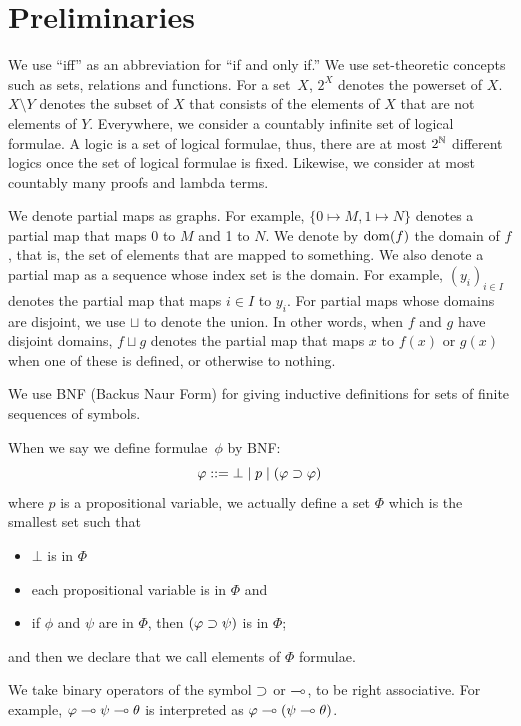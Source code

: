  \section{Preliminaries}
 \label{sec:prelim}

  We use ``iff'' as an abbreviation for ``if and only if.''
  We use set-theoretic concepts such as sets, relations and functions.
  For a set~$X$, $2^X$ denotes the powerset of $X$.
   $X\setminus Y$ denotes the subset of $X$ that consists of the
   elements of $X$ that are not elements of $Y$.
   Everywhere, we consider a countably infinite set of logical formulae.
   A logic is a set of logical formulae, thus, there are at most
   ${2^{\mathbb N}}$ different logics once the set of logical
   formulae is fixed.
   Likewise, we consider at most countably many proofs and lambda terms.

   We denote partial maps as graphs.
   For example, $\{0\mapsto M, 1\mapsto N\}$ denotes a partial map that
   maps 0 to $M$ and 1 to $N$.
   We denote by $\mathop{\mathrm{dom}}(f)$ the domain of $f$, that is,
   the set of elements that are mapped to something.
   We also denote a partial map as a sequence whose index set is the domain.
   For example, $(y_i)_{i\in I}$ denotes the partial map that maps
   $i\in I$ to $y_i$.
   For partial maps whose domains are disjoint, we use $\sqcup$ to
   denote the union.
   In other words, when $f$ and $g$ have disjoint domains, $f\sqcup g$
   denotes the
   partial map that maps $x$ to $f(x)$ or $g(x)$ when one of these is
   defined, or otherwise to nothing.

  We use BNF (Backus Naur Form) for giving inductive definitions for sets
  of finite sequences of symbols.
 \begin{example}
  When we say we define formulae~$\phi$ by BNF:
  \[
   \varphi::= \bot \mid p\mid (\varphi\supset\varphi)
  \]
  where $p$ is a propositional variable, we actually define a set $\Phi$
  which is the smallest set such that
  \begin{itemize}
   \item $\bot$ is in $\Phi$
   \item each propositional variable is in $\Phi$ and
   \item if $\phi$ and $\psi$ are in $\Phi$, then $(\varphi\supset\psi)$ is in $\Phi$;
  \end{itemize}
  and then we declare that we call elements of $\Phi$ formulae.
 \end{example}

 We take binary operators of the symbol $\supset$ or $\multimap$,
 to be right associative.  For example, $\varphi\multimap\psi\multimap\theta$
 is interpreted as $\varphi\multimap(\psi\multimap\theta)$.

